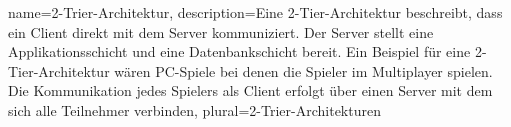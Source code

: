 {
    name={2-Trier-Architektur},
    description={Eine 2-Tier-Architektur beschreibt, dass ein Client direkt mit dem Server kommuniziert. Der Server stellt eine Applikationsschicht und eine Datenbankschicht bereit. Ein Beispiel für eine 2-Tier-Architektur wären PC-Spiele bei denen die Spieler im Multiplayer spielen. Die Kommunikation jedes Spielers als Client erfolgt über einen Server mit dem sich alle Teilnehmer verbinden},
    plural={2-Trier-Architekturen}
}


